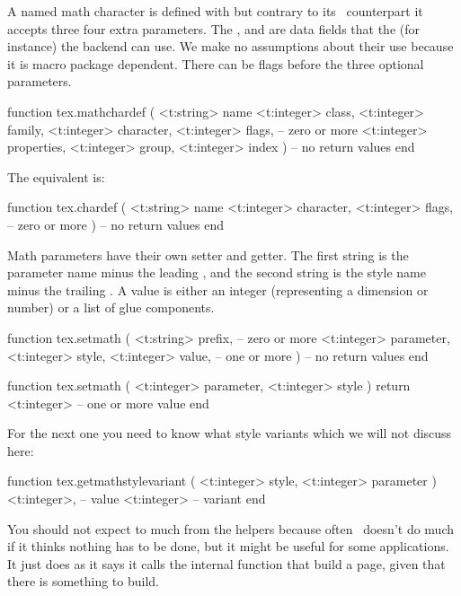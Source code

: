 A named math character is defined with  but contrary to its
\TEX\ counterpart \typ {\mathchardef} it accepts three four extra parameters.
The ,  and  are data fields that the
(for instance) the backend can use. We make no assumptions about their use
because it is macro package dependent. There can be flags before the three
optional parameters.

\starttyping[option=LUA]
function tex.mathchardef (
    <t:string>  name
    <t:integer> class,
    <t:integer> family,
    <t:integer> character,
    <t:integer> flags,  -- zero or more
    <t:integer> properties,
    <t:integer> group,
    <t:integer> index
)
    -- no return values
end
\stoptyping

The \type {\chardef} equivalent is:

\starttyping[option=LUA]
function tex.chardef (
    <t:string>  name
    <t:integer> character,
    <t:integer> flags,  -- zero or more
)
    -- no return values
end
\stoptyping

Math parameters have their own setter and getter. The first string is the
parameter name minus the leading , and the second string is the
style name minus the trailing . A value is either an integer
(representing a dimension or number) or a list of glue components.

\starttyping[option=LUA]
function tex.setmath (
    <t:string>  prefix, -- zero or more
    <t:integer> parameter,
    <t:integer> style,
    <t:integer> value,  -- one or more
)
    -- no return values
end
\stoptyping

\starttyping[option=LUA]
function tex.setmath (
    <t:integer> parameter,
    <t:integer> style
)
    return <t:integer> -- one or more value
end
\stoptyping

For the next one you need to know what style variants which we will not discuss
here:

\starttyping[option=LUA]
function tex.getmathstylevariant (
    <t:integer> style,
    <t:integer> parameter
)
    <t:integer>, -- value
    <t:integer>  -- variant
end
\stoptyping

\stopsubsection

\startsubsection[title=Processing]

You should not expect to much from the  helpers because
often \TEX\ doesn't do much if it thinks nothing has to be done, but it might be
useful for some applications. It just does as it says it calls the internal
function that build a page, given that there is something to build.


